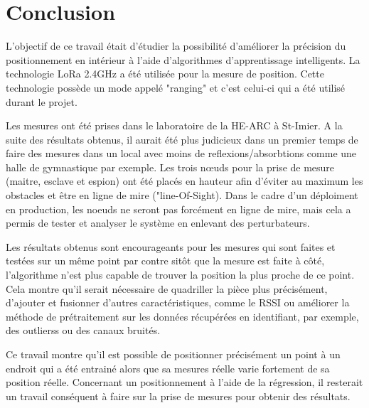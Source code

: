 \chapter{Conclusion}
L'objectif de ce travail était d'étudier la possibilité d'améliorer la précision du positionnement en intérieur à l'aide d'algorithmes d'apprentissage intelligents. La technologie LoRa 2.4GHz a été utilisée pour la mesure de position. Cette technologie possède un mode appelé "ranging" et c'est celui-ci qui a été utilisé durant le projet. 

Les mesures ont été prises dans le laboratoire de la HE-ARC à St-Imier. A la suite des résultats obtenus, il aurait été plus judicieux dans un premier temps de faire des mesures dans un local avec moins de reflexions/absorbtions comme une halle de gymnastique par exemple. Les trois nœuds pour la prise de mesure (maitre, esclave et espion) ont été placés en hauteur afin d'éviter au maximum les obstacles et être en ligne de mire ("line-Of-Sight). Dans le cadre d'un déploiment en production, les noeuds ne seront pas forcément en ligne de mire, mais cela a permis de tester et analyser le système en enlevant des perturbateurs. 

Les résultats obtenus sont encourageants pour les mesures qui sont faites et testées sur un même point par contre sitôt que la mesure est faite à côté, l'algorithme n'est plus capable de trouver la position la plus proche de ce point. Cela montre qu'il serait nécessaire de quadriller la pièce plus précisément, d'ajouter et fusionner d'autres caractéristiques, comme le RSSI ou améliorer la méthode de prétraitement sur les données récupérées en identifiant, par exemple, des outlierss ou des canaux bruités. 

Ce travail montre qu'il est possible de positionner précisément un point à un endroit qui a été entrainé alors que sa mesures réelle varie fortement de sa position réelle. Concernant un positionnement à l'aide de la régression, il resterait un travail conséquent à faire sur la prise de mesures pour obtenir des résultats.










